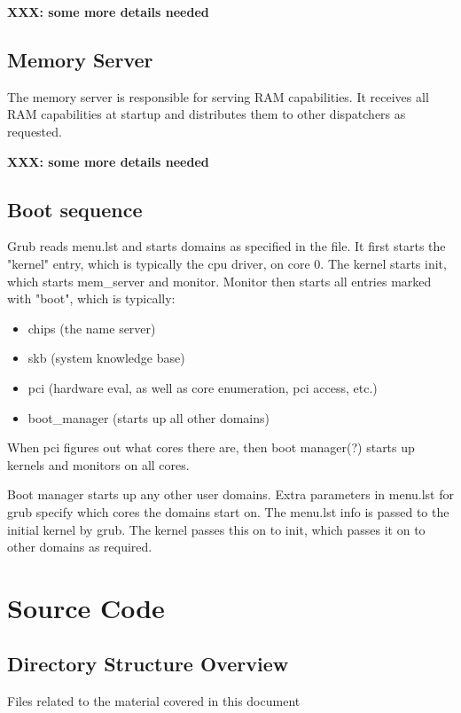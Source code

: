 \documentclass[a4paper,twoside]{report} %
\begin{document}
\textbf{XXX: some more details needed}

\section{Memory Server}
The memory server is responsible for serving RAM capabilities. It receives all
RAM capabilities at startup and distributes them to other dispatchers as
requested.

\textbf{XXX: some more details needed}

\section{Boot sequence}
Grub reads menu.lst and starts domains as specified in the file.  It first
starts the "kernel" entry, which is typically the cpu driver, on core 0. The
kernel starts init, which starts mem\_server and monitor. Monitor then starts all
entries marked with "boot", which is typically: 
\begin{itemize}
\item chips (the name server)
\item skb (system knowledge base) 
\item pci (hardware eval, as well as core enumeration, pci access, etc.)
\item boot\_manager (starts up all other domains)
\end{itemize}

When pci figures out what cores there are, then boot manager(?) starts up
kernels and monitors on all cores.

Boot manager starts up any other user domains. Extra parameters in menu.lst for
grub specify which cores the domains start on. The menu.lst info is passed to
the initial kernel by grub. The kernel passes this on to init, which passes it
on to other domains as required.



\chapter{Source Code}\label{chap:benchmarks}

\section{Directory Structure Overview}
Files related to the material covered in this document
\end{document}
